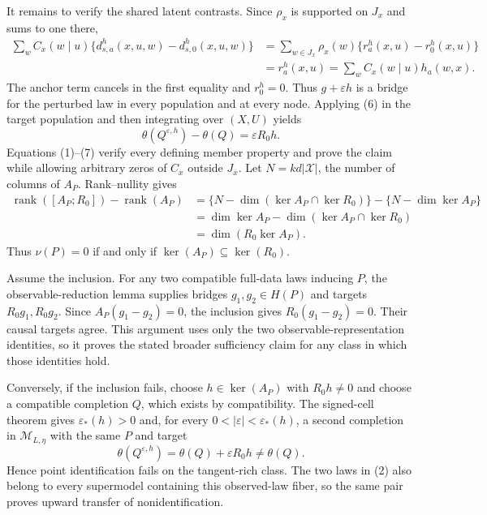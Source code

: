 It remains to verify the shared latent contrasts.  Since \(\rho_x\) is supported on \(J_x\) and sums to one there,
\[
\begin{aligned}
\sum_wC_x(w\mid u)\{d^h_{s,a}(x,u,w)-d^h_{s,0}(x,u,w)\}
&=\sum_{w\in J_x}\rho_x(w)\{r^h_a(x,u)-r^h_0(x,u)\}\\
&=r^h_a(x,u)
=\sum_wC_x(w\mid u)h_a(w,x).
\end{aligned}
\tag{6}
\]
The anchor term cancels in the first equality and \(r^h_0=0\).  Thus \(g+\varepsilon h\) is a bridge for the perturbed law in every population and at every node.  Applying (6) in the target population and then integrating over \((X,U)\) yields
\[
\theta(Q^{\varepsilon,h})-\theta(Q)=\varepsilon R_0h.
\tag{7}
\]
Equations (1)--(7) verify every defining member property and prove the claim while allowing arbitrary zeros of \(C_x\) outside \(J_x\).
Let \(N=kd|\mathcal X|\), the number of columns of \(A_P\).  Rank--nullity gives
\[
\begin{aligned}
\operatorname{rank}([A_P;R_0])-\operatorname{rank}(A_P)
&=\{N-\dim(\ker A_P\cap\ker R_0)\}-\{N-\dim\ker A_P\}\\
&=\dim\ker A_P-\dim(\ker A_P\cap\ker R_0)\\
&=\dim(R_0\ker A_P).
\end{aligned}
\tag{1}
\]
Thus \(\nu(P)=0\) if and only if \(\ker(A_P)\subseteq\ker(R_0)\).

Assume the inclusion.  For any two compatible full-data laws inducing \(P\), the observable-reduction lemma supplies bridges \(g_1,g_2\in H(P)\) and targets \(R_0g_1,R_0g_2\).  Since \(A_P(g_1-g_2)=0\), the inclusion gives \(R_0(g_1-g_2)=0\).  Their causal targets agree.  This argument uses only the two observable-representation identities, so it proves the stated broader sufficiency claim for any class in which those identities hold.

Conversely, if the inclusion fails, choose \(h\in\ker(A_P)\) with \(R_0h\ne0\) and choose a compatible completion \(Q\), which exists by compatibility.  The signed-cell theorem gives \(\varepsilon_*(h)>0\) and, for every \(0<|\varepsilon|<\varepsilon_*(h)\), a second completion in \(\mathcal M_{L,\eta}\) with the same \(P\) and target
\[
\theta(Q^{\varepsilon,h})=\theta(Q)+\varepsilon R_0h\ne\theta(Q).
\tag{2}
\]
Hence point identification fails on the tangent-rich class.  The two laws in (2) also belong to every supermodel containing this observed-law fiber, so the same pair proves upward transfer of nonidentification.

